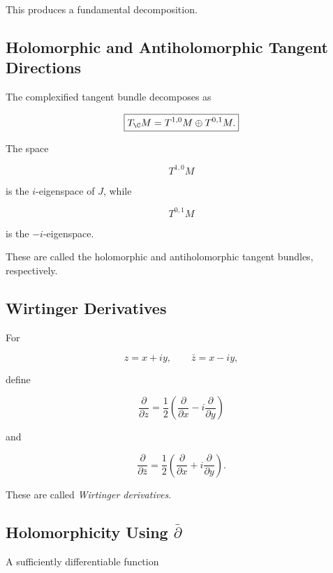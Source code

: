 This produces a fundamental decomposition.

\subsection{Holomorphic and Antiholomorphic Tangent Directions}
\label{subsec:holomorphic-antiholomorphic-directions}

The complexified tangent bundle decomposes as

\[
\boxed{
T_{\C}M
=
T^{1,0}M
\oplus
T^{0,1}M.
}
\]

The space

\[
T^{1,0}M
\]

is the \(i\)-eigenspace of \(J\), while

\[
T^{0,1}M
\]

is the \(-i\)-eigenspace.

These are called the holomorphic and antiholomorphic tangent bundles,
respectively.

\subsection{Wirtinger Derivatives}
\label{subsec:wirtinger-derivatives}

For

\[
z=x+iy,
\qquad
\bar z=x-iy,
\]

define

\[
\boxed{
\frac{\partial}{\partial z}
=
\frac12
\left(
\frac{\partial}{\partial x}
-
i\frac{\partial}{\partial y}
\right)
}
\]

and

\[
\boxed{
\frac{\partial}{\partial\bar z}
=
\frac12
\left(
\frac{\partial}{\partial x}
+
i\frac{\partial}{\partial y}
\right).
}
\]

These are called \emph{Wirtinger derivatives}.

\subsection{Holomorphicity Using \(\bar{\partial}\)}
\label{subsec:holomorphicity-bar-partial}

A sufficiently differentiable function

